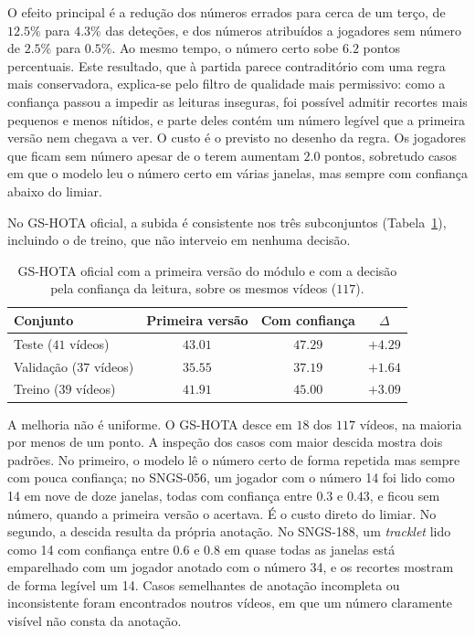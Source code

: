 O efeito principal é a redução dos números errados para cerca de um terço, de $12.5\%$ para
$4.3\%$ das deteções, e dos números atribuídos a jogadores sem número de $2.5\%$ para $0.5\%$. %
Ao mesmo tempo, o número certo sobe $6.2$ pontos percentuais. %
Este resultado, que à partida parece contraditório com uma regra mais conservadora, explica-se pelo
filtro de qualidade mais permissivo: como a confiança passou a impedir as leituras inseguras, foi
possível admitir recortes mais pequenos e menos nítidos, e parte deles contém um número legível que
a primeira versão nem chegava a ver. O custo é o previsto no desenho da regra. Os jogadores que
ficam sem número apesar de o terem aumentam $2.0$ pontos, sobretudo casos em que o modelo leu o %
número certo em várias janelas, mas sempre com confiança abaixo do limiar.

No GS-HOTA oficial, a subida é consistente nos três subconjuntos
(Tabela~\ref{tab:jnr-confianca-gshota}), incluindo o de treino, que não interveio em nenhuma decisão.

\begin{table}[htbp]
    \centering
    \caption{GS-HOTA oficial com a primeira versão do módulo e com a decisão pela confiança da
    leitura, sobre os mesmos vídeos ($117$). %
    }
    \label{tab:jnr-confianca-gshota}
    \begin{tabular}{|l|c|c|c|}
        \hline
        \textbf{Conjunto} & \textbf{Primeira versão} & \textbf{Com confiança} & \textbf{$\Delta$} \\
        \hline
        Teste ($41$ vídeos)     & $43.01$ & $47.29$ & $+4.29$ \\ %
        \hline
        Validação ($37$ vídeos) & $35.55$ & $37.19$ & $+1.64$ \\ %
        \hline
        Treino ($39$ vídeos)    & $41.91$ & $45.00$ & $+3.09$ \\ %
        \hline
    \end{tabular}
\end{table}

A melhoria não é uniforme. O GS-HOTA desce em $18$ dos $117$ vídeos, na maioria por menos de um %
ponto. A inspeção dos casos com maior descida mostra dois padrões. No primeiro, o modelo lê o número
certo de forma repetida mas sempre com pouca confiança; no SNGS-056, um jogador com o número 14 foi
lido como 14 em nove de doze janelas, todas com confiança entre $0.3$ e $0.43$, e ficou sem número,
quando a primeira versão o acertava. É o custo direto do limiar. No segundo, a descida resulta da
própria anotação. No SNGS-188, um \emph{tracklet} lido como 14 com confiança entre $0.6$ e $0.8$ em
quase todas as janelas está emparelhado com um jogador anotado com o número 34, e os recortes
mostram de forma legível um 14. Casos semelhantes de anotação incompleta ou inconsistente foram
encontrados noutros vídeos, em que um número claramente visível não consta da anotação.

